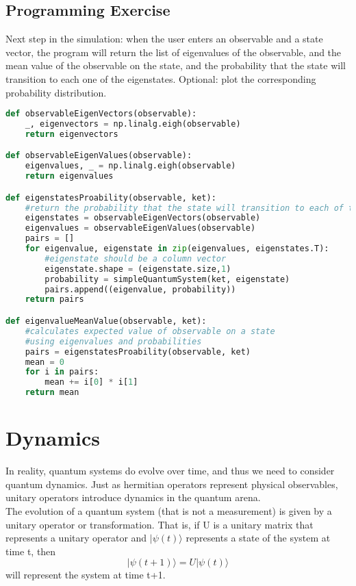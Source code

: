 \documentclass{article}
\begin{document}
\subsection{Programming Exercise}
Next step in the simulation: when the user enters an observable and a state vector, the program will return the list of eigenvalues of the observable, and the mean value of the observable on the state, and the probability that the state will transition to each one of the eigenstates. Optional: plot the corresponding probability distribution.\\
\begin{lstlisting}[language=Python]
def observableEigenVectors(observable):
    _, eigenvectors = np.linalg.eigh(observable)
    return eigenvectors

def observableEigenValues(observable):
    eigenvalues, _ = np.linalg.eigh(observable)
    return eigenvalues

def eigenstatesProability(observable, ket):
    #return the probability that the state will transition to each of the eigenstates
    eigenstates = observableEigenVectors(observable)
    eigenvalues = observableEigenValues(observable)
    pairs = []
    for eigenvalue, eigenstate in zip(eigenvalues, eigenstates.T):
        #eigenstate should be a column vector
        eigenstate.shape = (eigenstate.size,1)
        probability = simpleQuantumSystem(ket, eigenstate)
        pairs.append((eigenvalue, probability))
    return pairs

def eigenvalueMeanValue(observable, ket):
    #calculates expected value of observable on a state
    #using eigenvalues and probabilities
    pairs = eigenstatesProability(observable, ket)
    mean = 0
    for i in pairs:
        mean += i[0] * i[1]
    return mean
\end{lstlisting}


\section{Dynamics}

In reality, quantum systems do evolve over time, and thus we need to consider quantum dynamics. Just as hermitian operators represent physical observables, unitary operators introduce dynamics in the quantum arena.\\

The evolution of a quantum system (that is not a measurement) is given by a unitary operator or transformation. That is, if U is a unitary matrix that represents a unitary operator and $|\psi(t)\rangle$ represents a state of the system at time t, then
\begin{equation}
    |\psi(t+1)\rangle = U|\psi(t)\rangle
\end{equation}
will represent the system at time t+1.\\
\end{document}
